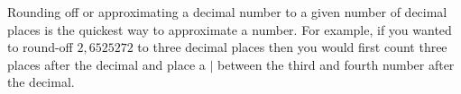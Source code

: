       \label{m38349*id324198}Rounding off or approximating a decimal number to a given number of decimal places is the quickest way to approximate a number. For example, if you wanted to round-off \begin{math}2,6525272\end{math} to three decimal places then you would first count three places after the decimal and place a \begin{math}|\end{math} between the third and fourth number after the decimal.\par 
      \label{m38349*id325085}\nopagebreak\noindent{}
    
